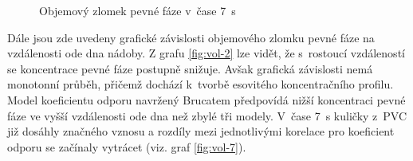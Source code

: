 \begin{figure}[h!]
  \qquad
  \caption{Objemový zlomek pevné fáze v~čase \SI{7}{\second}}
  \label{fig:cd7}
\end{figure}
\newpage
\vspace{-5mm}
Dále jsou zde uvedeny grafické závislosti objemového zlomku pevné fáze na vzdálenosti ode dna nádoby. Z grafu \ref{fig:vol-2} lze vidět, že s~rostoucí vzdáleností se koncentrace pevné fáze postupně snižuje. Avšak grafická závislosti nemá monotonní průběh, přičemž dochází k~tvorbě esovitého koncentračního profilu. Model koeficientu odporu navržený Brucatem předpovídá nižší koncentraci pevné fáze ve vyšší vzdálenosti ode dna než zbylé tři modely. V~čase \SI{7}{\second} kuličky z~PVC již dosáhly značného vznosu a rozdíly mezi jednotlivými korelace pro koeficient odporu se začínaly vytrácet (viz. graf \ref{fig:vol-7}).
